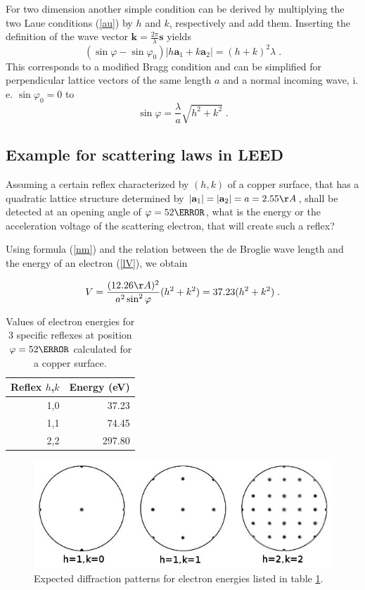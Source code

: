 \documentclass[a4paper]{scrartcl}
\numberwithin{equation}{section}
\numberwithin{figure}{section}
\numberwithin{table}{section}
\newcommand{\eq}[2]{\begin{equation}#1\label{#2}\end{equation}}
\newcommand{\Formel}[1]{(\ref{#1})}
\newcommand{\ve}[1]{\mathbf{ #1} }
\begin{document}
For two dimension another simple condition can be derived by multiplying the two Laue conditions \Formel{au} by $h$ and $k$, respectively and add them. Inserting the definition of the wave vector $\ve k=\frac{2\pi}{\lambda} \ve s$ yields
\eq{(\sin \varphi - \sin \varphi_0) |h \ve a_1 + k \ve a_2| = (h + k)^2 \lambda \; .} {}
This corresponds to a modified Bragg condition and can be simplified for perpendicular lattice vectors of the same length $a$ and a normal incoming wave, i. e. $\sin \varphi_0  =0$ to
\eq{\sin \varphi =\frac{\lambda}{a} \sqrt{h^2+k^2} \; .}{nm}

\subsection{Example for scattering laws in LEED}
Assuming a certain reflex characterized by $(h,k)$ of a copper surface, that has a quadratic lattice structure determined by $|\ve a_1|=|\ve a_2|=a=2.55 \AA$, shall be detected at an opening angle of $\varphi = 52 \degree$, what is the energy or the acceleration voltage of the scattering electron, that will create such a reflex?

Using formula \Formel{nm} and the relation between the de Broglie wave length and the energy of an electron \Formel{lV}, we obtain

\eq{ V =\frac{(12.26 \AA)^2}{a^2 \sin^2 \varphi} (h^2+k^2) = 37.23 (h^2 +k^2) \; .}{V}
\FloatBarrier
\begin{table}[!h]
\centering
\begin{tabular}{rr}
\toprule
Reflex $h$,$k$ & Energy (eV) \\
\midrule
1,0 & 37.23 \\
1,1 & 74.45 \\
2,2 & 297.80 \\
 \bottomrule
\end{tabular}
\caption{\small Values of electron energies for 3 specific reflexes at position $\varphi =52\degree$ calculated for a copper surface. }
\label{kll}
\end{table}

\begin{figure}
  \centering
   	\includegraphics[width=0.7\linewidth]{pic/52.jpeg}

 \caption{\small Expected diffraction patterns for electron energies listed in table \ref{kll}.}
        \label{fig:bragg}
\end{figure}
\FloatBarrier
\end{document}
